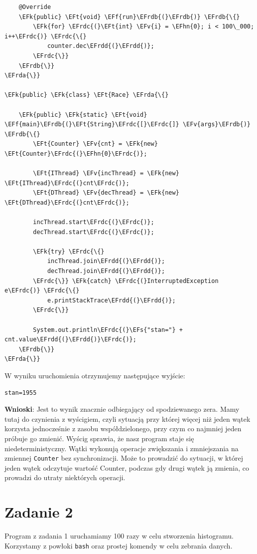 \documentclass[11pt]{article}
\newcommand{\EFs}[1]{\textcolor{EFs}{#1}} %
\newcommand{\EFk}[1]{\textbf{#1}} %
\newcommand{\EFf}[1]{\textbf{#1}} %
\newcommand{\EFv}[1]{#1} %
\newcommand{\EFt}[1]{\textbf{#1}} %
\newcommand{\EFhn}[1]{\textcolor{EFhn}{\textbf{#1}}} %
\newcommand{\EFrda}[1]{\textcolor{EFrda}{#1}} %
\newcommand{\EFrdb}[1]{\textcolor{EFrdb}{#1}} %
\newcommand{\EFrdc}[1]{\textcolor{EFrdc}{#1}} %
\newcommand{\EFrdd}[1]{\textcolor{EFrdd}{#1}} %
\begin{document}
\begin{Code}
\begin{Verbatim}
    @Override
    \EFk{public} \EFt{void} \EFf{run}\EFrdb{(}\EFrdb{)} \EFrdb{\{}
        \EFk{for} \EFrdc{(}\EFt{int} \EFv{i} = \EFhn{0}; i < 100\_000; i++\EFrdc{)} \EFrdc{\{}
            counter.dec\EFrdd{(}\EFrdd{)};
        \EFrdc{\}}
    \EFrdb{\}}
\EFrda{\}}

\EFk{public} \EFk{class} \EFt{Race} \EFrda{\{}

    \EFk{public} \EFk{static} \EFt{void} \EFf{main}\EFrdb{(}\EFt{String}\EFrdc{[}\EFrdc{]} \EFv{args}\EFrdb{)} \EFrdb{\{}
        \EFt{Counter} \EFv{cnt} = \EFk{new} \EFt{Counter}\EFrdc{(}\EFhn{0}\EFrdc{)};

        \EFt{IThread} \EFv{incThread} = \EFk{new} \EFt{IThread}\EFrdc{(}cnt\EFrdc{)};
        \EFt{DThread} \EFv{decThread} = \EFk{new} \EFt{DThread}\EFrdc{(}cnt\EFrdc{)};

        incThread.start\EFrdc{(}\EFrdc{)};
        decThread.start\EFrdc{(}\EFrdc{)};

        \EFk{try} \EFrdc{\{}
            incThread.join\EFrdd{(}\EFrdd{)};
            decThread.join\EFrdd{(}\EFrdd{)};
        \EFrdc{\}} \EFk{catch} \EFrdc{(}InterruptedException e\EFrdc{)} \EFrdc{\{}
            e.printStackTrace\EFrdd{(}\EFrdd{)};
        \EFrdc{\}}

        System.out.println\EFrdc{(}\EFs{"stan="} + cnt.value\EFrdd{(}\EFrdd{)}\EFrdc{)};
    \EFrdb{\}}
\EFrda{\}}

\end{Verbatim}
\end{Code}

W wyniku uruchomienia otrzymujemy następujące wyjście:
\begin{tcolorbox}
\begin{Verbatim}
stan=1955
\end{Verbatim}


\end{tcolorbox}\textbf{Wnioski}: Jest to wynik znacznie odbiegający od spodziewanego zera.  Mamy tutaj do
czynienia z wyścigiem, czyli sytuacją przy której więcej niż jeden wątek
korzysta jednocześnie z zasobu współdzielonego, przy czym co najmniej jeden
próbuje go zmienić. Wyścig sprawia, że nasz program staje się
niedeterministyczny. Wątki wykonują operacje zwiększania i zmniejszania na
zmiennej \texttt{Counter} bez synchronizacji. Może to prowadzić do sytuacji, w której
jeden wątek odczytuje wartość Counter, podczas gdy drugi wątek ją zmienia, co
prowadzi do utraty niektórych operacji.
\section*{Zadanie 2}
\label{sec:org336ea07}
Program z zadania 1 uruchamiamy 100 razy w celu stworzenia histogramu.
Korzystamy z powłoki \texttt{bash} oraz prostej komendy w celu zebrania danych.
\end{document}

